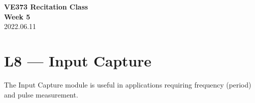 \documentclass[a4paper]{article}
\begin{document}
\renewcommand{\thesection}{\Roman{section}}
\renewcommand{\thesubsection}{\Alph{subsection}}
\renewcommand{\thesubsubsection}{\thesubsection.\arabic{subsubsection}}
\renewcommand{\d}{\: \mathrm{d}}
\newcommand{\e}{\mathrm{e}}

\begin{center}
	\textbf{\Large VE373 Recitation Class}\\[1em]
	\textbf{\large Week 5} \\[1em]
	2022.06.11 \\[1em]
\end{center}

\section*{L8 --- Input Capture}
	\par The Input Capture module is useful in applications requiring frequency (period) and pulse measurement.
\end{document}
